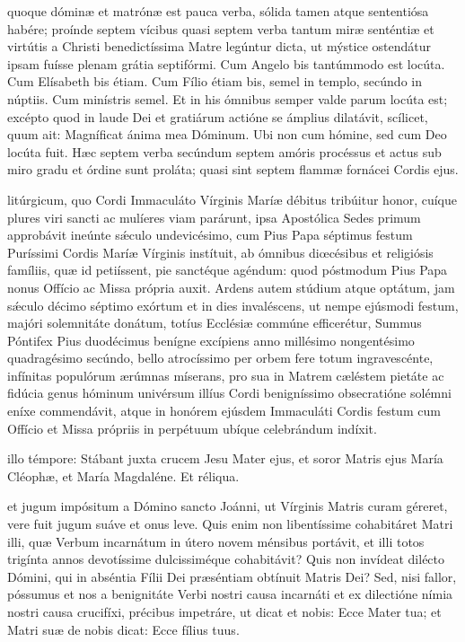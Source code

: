 \documentclass[fontsize=7.9pt,paper=A6,twoside,BCOR=1mm,DIV=24,headinclude]{scrarticle}
\begin{document}
\begin{multicols}{2}
{\mRVBMVvi

 quoque dóminæ et matrónæ est pauca verba, sólida tamen atque sententiósa habére; proínde septem vícibus quasi septem verba tantum miræ senténtiæ et virtútis a Christi benedictíssima Matre legúntur dicta, ut mýstice ostendátur ipsam fuísse plenam grátia septifórmi. Cum Angelo bis tantúmmodo est locúta. Cum Elísabeth bis étiam. Cum Fílio étiam bis, semel in templo, secúndo in núptiis. Cum minístris semel. Et in his ómnibus semper valde parum locúta est; excépto quod in laude Dei et gratiárum actióne se ámplius dilatávit, scílicet, quum ait: Magníficat ánima mea Dóminum. Ubi non cum hómine, sed cum Deo locúta fuit. Hæc septem verba secúndum septem amóris procéssus et actus sub miro gradu et órdine sunt proláta; quasi sint septem flammæ fornácei Cordis ejus.

\mRVBMVvii

 litúrgicum, quo Cordi Immaculáto Vírginis Maríæ débitus tribúitur honor, cuíque plures viri sancti ac mulíeres viam parárunt, ipsa Apostólica Sedes primum approbávit ineúnte sǽculo undevicésimo, cum Pius Papa séptimus festum Puríssimi Cordis Maríæ Vírginis instítuit, ab ómnibus diœcésibus et religiósis famíliis, quæ id petiíssent, pie sanctéque agéndum: quod póstmodum Pius Papa nonus Offício ac Missa própria auxit. Ardens autem stúdium atque optátum, jam sǽculo décimo séptimo exórtum et in dies invaléscens, ut nempe ejúsmodi festum, majóri solemnitáte donátum, totíus Ecclésiæ commúne efficerétur, Summus Póntifex Pius duodécimus benígne excípiens anno millésimo nongentésimo quadragésimo secúndo, bello atrocíssimo per orbem fere totum ingravescénte, infínitas populórum ærúmnas míserans, pro sua in Matrem cæléstem pietáte ac fidúcia genus hóminum univérsum illíus Cordi benigníssimo obsecratióne solémni eníxe commendávit, atque in honórem ejúsdem Immaculáti Cordis festum cum Offício et Missa própriis in perpétuum ubíque celebrándum indíxit.

\mRVBMVviii

 illo témpore: Stábant juxta crucem Jesu Mater ejus, et soror Matris ejus María Cléophæ, et María Magdaléne. Et réliqua.

 et jugum impósitum a Dómino sancto Joánni, ut Vírginis Matris curam géreret, vere fuit jugum suáve et onus leve. Quis enim non libentíssime cohabitáret Matri illi, quæ Verbum incarnátum in útero novem ménsibus portávit, et illi totos trigínta annos devotíssime dulcissiméque cohabitávit? Quis non invídeat dilécto Dómini, qui in abséntia Fílii Dei præséntiam obtínuit Matris Dei? Sed, nisi fallor, póssumus et nos a benignitáte Verbi nostri causa incarnáti et ex dilectióne nímia nostri causa crucifíxi, précibus impetráre, ut dicat et nobis: Ecce Mater tua; et Matri suæ de nobis dicat: Ecce fílius tuus.

}
\end{multicols}
\end{document}
